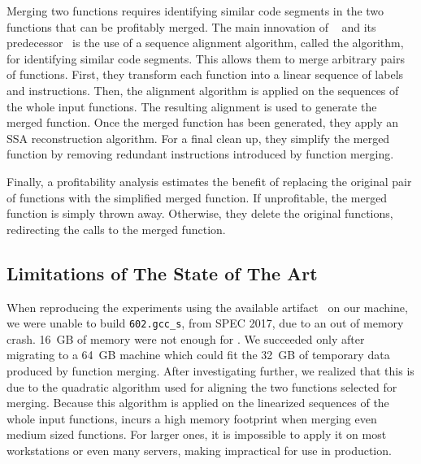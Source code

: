 Merging two functions requires identifying similar code segments in the two functions that can be profitably merged.
The main innovation of \SOAName~\cite{rocha20} and its predecessor~\cite{rocha19} is the use of a sequence alignment algorithm, called the \NW algorithm, for identifying similar code segments.
This allows them to merge arbitrary pairs of functions.
First, they transform each function into a linear sequence of labels and instructions.
Then, the alignment algorithm is applied on the sequences of the whole input functions.
The resulting alignment is used to generate the merged function.
Once the merged function has been generated, they apply an SSA reconstruction algorithm.
For a final clean up, they simplify the merged function by removing redundant instructions introduced by function merging.

Finally, a profitability analysis estimates the benefit of replacing the original pair of functions with the simplified merged function. If unprofitable, the merged function is simply thrown away. Otherwise, they delete the original functions, redirecting the calls to the merged function.

\subsection{Limitations of The State of The Art}

When reproducing the {\SOAName} experiments using the available artifact~\cite{rocha20} on our machine, we were unable to build \texttt{602.gcc\_s}, from SPEC 2017, due to an out of memory crash. 16~GB of memory were not enough for {\SOAName}. 
We succeeded only after migrating to a 64~GB machine which could fit the 32~GB of temporary data produced by function merging.
After investigating further, we realized that this is due to the quadratic algorithm used for aligning the two functions selected for merging.
Because this algorithm is applied on the linearized sequences of the whole input functions, \SOAName incurs a high memory footprint when merging even medium sized functions.
For larger ones, it is impossible to apply it on most workstations or even many servers, making {\SOAName} impractical for use in production.


